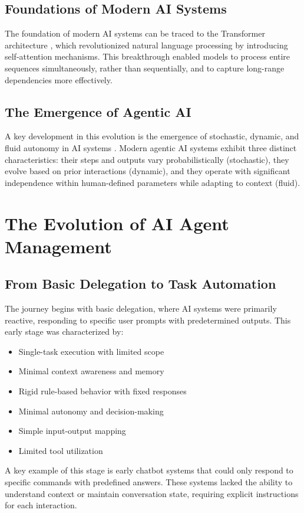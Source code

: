 \documentclass[conference]{IEEEtran}
\begin{document}
\subsection{Foundations of Modern AI Systems}
The foundation of modern AI systems can be traced to the Transformer architecture \cite{vaswani2017attention}, which revolutionized natural language processing by introducing self-attention mechanisms. This breakthrough enabled models to process entire sequences simultaneously, rather than sequentially, and to capture long-range dependencies more effectively.

\subsection{The Emergence of Agentic AI}
A key development in this evolution is the emergence of stochastic, dynamic, and fluid autonomy in AI systems \cite{mukherjee2024stochastic}. Modern agentic AI systems exhibit three distinct characteristics: their steps and outputs vary probabilistically (stochastic), they evolve based on prior interactions (dynamic), and they operate with significant independence within human-defined parameters while adapting to context (fluid).

\section{The Evolution of AI Agent Management}
\subsection{From Basic Delegation to Task Automation}
The journey begins with basic delegation, where AI systems were primarily reactive, responding to specific user prompts with predetermined outputs. This early stage was characterized by:
\begin{itemize}
\item Single-task execution with limited scope
\item Minimal context awareness and memory
\item Rigid rule-based behavior with fixed responses
\item Minimal autonomy and decision-making
\item Simple input-output mapping
\item Limited tool utilization
\end{itemize}

A key example of this stage is early chatbot systems that could only respond to specific commands with predefined answers. These systems lacked the ability to understand context or maintain conversation state, requiring explicit instructions for each interaction.
\end{document}
